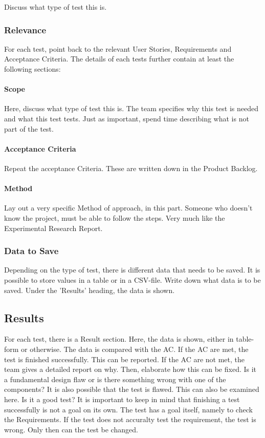 \documentclass[10pt]{report}
\begin{document}
Discuss what type of test this is.

\subsubsection{Relevance}

For each test, point back to the relevant User Stories, Requirements and Acceptance Criteria. The details of each tests further contain at least the following sections:

\paragraph{Scope}

Here, discuss what type of test this is. The team specifies why this test is needed and what this test tests. Just as important, spend time describing what is not part of the test.

\paragraph{Acceptance Criteria}

Repeat the acceptance Criteria. These are written down in the Product Backlog.

\paragraph{Method}

Lay out a very specific Method of approach, in this part. Someone who doesn't know the project, must be able to follow the steps. Very much like the Experimental Research Report.

\subsubsection{Data to Save}

Depending on the type of test, there is different data that needs to be saved. It is possible to store values in a table or in a CSV-file. Write down what data is to be saved. Under the 'Results' heading, the data is shown.

\subsection{Results}

For each test, there is a Result section. Here, the data is shown, either in table-form or otherwise. The data is compared with the AC. If the AC are met, the test is finished successfully. This can be reported. If the AC are not met, the team gives a detailed report on why. Then, elaborate how this can be fixed. Is it a fundamental design flaw or is there something wrong with one of the components? It is also possible that the test is flawed. This can also be examined here. Is it a good test? It is important to keep in mind that finishing a test successfully is not a goal on its own. The test has a goal itself, namely to check the Requirements. If the test does not accuralty test the requirement, the test is wrong. Only then can the test be changed.
\end{document}
